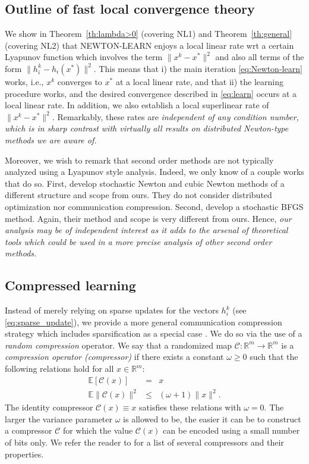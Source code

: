 \documentclass[10pt]{article}
\newcommand{\R}{\mathbb{R}}
\newcommand{\newalpha}{h}
\newcommand{\cC}{{\mathcal{C}}}
\begin{document}
\subsection{Outline of fast local convergence theory} We show in Theorem~\ref{th:lambda>0} (covering {\sf NL1}) and Theorem~\ref{th:general} (covering {\sf NL2}) that {\sf NEWTON-LEARN} enjoys a local linear rate wrt a certain Lyapunov function which  involves the term $\|x^k - x^*\|^2$ and also all terms of the form $\|h^k_i - \newalpha_i(x^*)\|^2$. This means that i) the main iteration \eqref{eq:Newton-learn} works, i.e., $x^k$ converges to $x^*$ at a local linear  rate, and that ii) the learning procedure works, and the desired convergence described in \eqref{eq:learn} occurs at a local linear rate. In addition, we also establish a local superlinear rate of $\|x^k - x^*\|^2$. Remarkably,  these rates are {\em independent of any condition number, which is  in sharp contrast with virtually all results on distributed Newton-type methods we are aware of.} 

Moreover, we wish to remark that second order methods are not typically analyzed using a Lyapunov style analysis. Indeed, we only know of a couple works that do so.  First, \citet{SN2019} develop stochastic Newton and cubic Newton methods of a different structure and scope from ours. They do not consider distributed optimization nor communication compression. Second, \citet{RBFGS2020} develop a stochastic BFGS method. Again, their method and scope is very different from ours. Hence, {\em our analysis may be of independent interest as it  adds to the arsenal of theoretical tools which could be used in a more precise analysis of other second order methods.}


\subsection{Compressed learning}

Instead of merely relying on sparse updates for the vectors $h_i^k$ (see \eqref{eq:sparse_update}), we provide a more general communication compression strategy which includes sparsification as a special case \citep{Alistarh17}. We do so via the use of a {\em random compression} operator.  We say that a randomized map $\cC:\R^m\to \R^m$ is  a {\em compression operator (compressor)} if  there exists a constant $\omega \geq 0$ such that the following relations hold for all $x\in \R^m$:
\begin{eqnarray} 
\mathbb{E}[\cC(x) ] &=& x \label{eq:unbiased} \\ 
\mathbb{E}\|\cC(x)\|^2 &\leq &(\omega + 1)\|x\|^2.\label{eq:omega-variance}
\end{eqnarray} 
The identity compressor $\cC(x)\equiv x$ satisfies these relations with $\omega=0$. The larger the variance parameter $\omega$ is allowed to be, the easier it can be to construct a compressor $\cC$ for which the value $\cC(x)$ can be encoded using a small number of bits only. We refer the reader to \citep{biased2020} for a list of several compressors and their properties.
\end{document}
